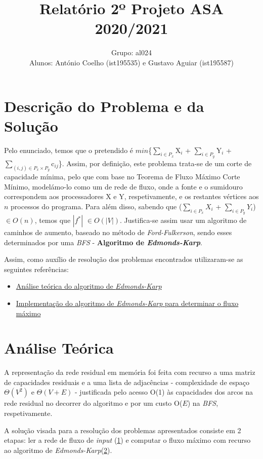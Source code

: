\documentclass[12pt]{article}
\author{
	Grupo: al024\\Alunos: António Coelho (ist195535) e Gustavo Aguiar (ist195587)
}
\title{\vspace{-2cm}Relatório 2º Projeto ASA 2020/2021}
\date{}
\begin{document}
\maketitle
\section{Descrição do Problema e da Solução}
Pelo enunciado, temos que o pretendido é $min$\{$\sum_{i\in{P_{x}}}$X$_{i}$ + $\sum_{i\in{P_{y}}}$Y$_{i}$ + $\sum_{(i, j)\in{P_{x} \times P_{y}}}$c$_{ij}$\}. Assim, por definição, este problema trata-se de um corte de capacidade mínima, pelo que com base no Teorema de Fluxo Máximo Corte Mínimo, modelámo-lo como um de rede de fluxo, onde a fonte e o sumidouro correspondem aos processadores X e Y, respetivamente, e os restantes vértices aos $n$ processos do programa.
Para além disso, sabendo que ($\sum_{i\in{P_{x}}}$$X_{i}$ + $\sum_{i\in{P_{y}}}$$Y_{i}$) $\in{O(n)}$, temos que $\left|f^{*}\right|$ $\in{O(\left|V\right|)}$. Justifica-se assim usar um algoritmo de caminhos de aumento, baseado no método de \emph{Ford-Fulkerson}, sendo esses determinados por uma \emph{BFS} - \textbf{Algoritmo de \emph{Edmonds-Karp}}.

Assim, como auxílio de resolução dos problemas encontrados utilizaram-se as seguintes referências:
\begin{itemize}
\item\href{https://brilliant.org/wiki/edmonds-karp-algorithm/}{Análise teórica do algoritmo de \emph{Edmonds-Karp}}
\item\href{https://www.geeksforgeeks.org/ford-fulkerson-algorithm-for-maximum-flow-problem/}{Implementação do algoritmo de \emph{Edmonds-Karp} para determinar o fluxo máximo}
\end{itemize}
 
 \section{Análise Teórica}
 A representação da rede residual em memória foi feita com recurso a uma matriz de capacidades residuais e a uma lista de adjacências - complexidade de espaço $\Theta{(V^2)}$ e $\Theta{(V+E)}$ - justificada pelo acesso O(1) às capacidades dos arcos na rede residual no decorrer do algoritmo e por um custo O($E$) na \emph{BFS}, respetivamente.

A solução visada para a resolução dos problemas apresentados consiste em 2 etapas: ler a rede de fluxo de \emph{input} (\underline{1}) e computar o fluxo máximo com recurso ao algoritmo de \emph{Edmonds-Karp}(\underline{2}).
\end{document}
